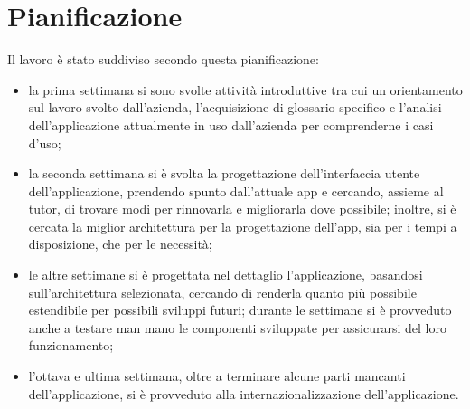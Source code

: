 \section{Pianificazione}
\label{sec:pianificazione}

Il lavoro è stato suddiviso secondo questa pianificazione:
\begin{itemize}
    \item la prima settimana si sono svolte attività introduttive tra cui un orientamento sul lavoro svolto dall'azienda, l'acquisizione di glossario specifico e l'analisi dell'applicazione attualmente in uso dall'azienda per comprenderne i casi d'uso;
    \item la seconda settimana si è svolta la progettazione dell'interfaccia utente dell'applicazione, prendendo spunto dall'attuale app e cercando, assieme al tutor, di trovare modi per rinnovarla e migliorarla dove possibile; inoltre, si è cercata la miglior architettura per la progettazione dell'app, sia per i tempi a disposizione, che per le necessità;
    \item le altre settimane si è progettata nel dettaglio l'applicazione, basandosi sull'architettura selezionata, cercando di renderla quanto più possibile estendibile per possibili sviluppi futuri; durante le settimane si è provveduto anche a testare man mano le componenti sviluppate per assicurarsi del loro funzionamento;
    \item l'ottava e ultima settimana, oltre a terminare alcune parti mancanti dell'applicazione, si è provveduto alla internazionalizzazione dell'applicazione.
\end{itemize}